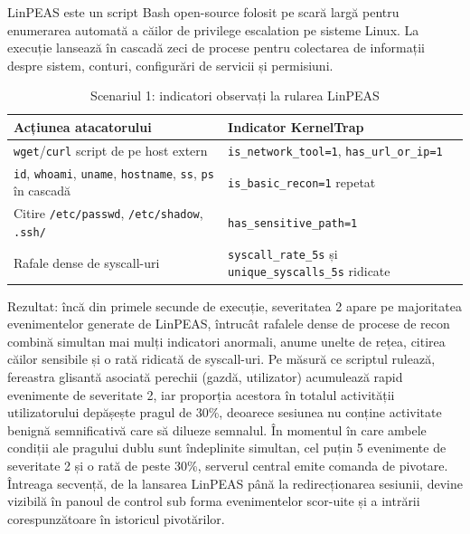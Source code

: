 LinPEAS este un script Bash open-source folosit pe scară largă pentru
enumerarea automată a căilor de privilege escalation pe sisteme Linux. La
execuție lansează în cascadă zeci de procese pentru colectarea de informații
despre sistem, conturi, configurări de servicii și permisiuni.

\begin{table}[h]
  \centering
  \caption{Scenariul 1: indicatori observați la rularea LinPEAS}
  \label{tab:cap6-scen1}
  \renewcommand{\arraystretch}{1.08}
  \begin{tabular}{|p{}|p{}|}
    \hline
    \textbf{Acțiunea atacatorului} & \textbf{Indicator KernelTrap} \\
    \hline\hline
    \texttt{wget}/\texttt{curl} script de pe host extern   & \texttt{is\_network\_tool=1}, \texttt{has\_url\_or\_ip=1} \\
    \hline
    \texttt{id}, \texttt{whoami}, \texttt{uname}, \texttt{hostname}, \texttt{ss}, \texttt{ps} în cascadă & \texttt{is\_basic\_recon=1} repetat \\
    \hline
    Citire \texttt{/etc/passwd}, \texttt{/etc/shadow}, \texttt{.ssh/}      & \texttt{has\_sensitive\_path=1} \\
    \hline
    Rafale dense de syscall-uri          & \texttt{syscall\_rate\_5s} și \texttt{unique\_syscalls\_5s} ridicate \\
    \hline
  \end{tabular}
\end{table}

Rezultat: încă din primele secunde de execuție, severitatea 2 apare pe
majoritatea evenimentelor generate de LinPEAS, întrucât rafalele dense de procese
de recon combină simultan mai mulți indicatori anormali, anume unelte de rețea,
citirea căilor sensibile și o rată ridicată de syscall-uri. Pe măsură ce scriptul
rulează, fereastra glisantă asociată perechii (gazdă, utilizator) acumulează
rapid evenimente de severitate 2, iar proporția acestora în totalul activității
utilizatorului depășește pragul de 30\%, deoarece sesiunea nu conține activitate
benignă semnificativă care să dilueze semnalul. În momentul în care ambele
condiții ale pragului dublu sunt îndeplinite simultan, cel puțin 5 evenimente de
severitate 2 și o rată de peste 30\%, serverul central emite comanda de pivotare.
Întreaga secvență, de la lansarea LinPEAS până la redirecționarea sesiunii,
devine vizibilă în panoul de control sub forma evenimentelor scor-uite și a
intrării corespunzătoare în istoricul pivotărilor.

